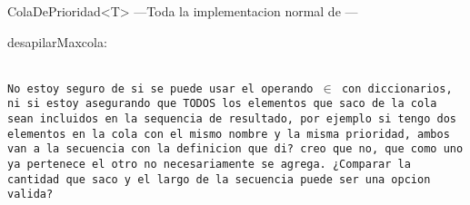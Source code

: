 \documentclass[10pt,a4paper]{article}
\begin{document}
\begin{tad}{ColaDePrioridad\textless T\textgreater}
    ---Toda la implementacion normal de \nt ---
    \begin{proc}{desapilarMax}{\Inout cola:\nt}{}
        {\color{red}}
    \end{proc}
\end{tad}
\\\texttt{\color{red}No estoy seguro de si se puede usar el operando $\in$ con diccionarios, ni si estoy asegurando que TODOS los 
elementos que saco de la cola sean incluidos en la sequencia de resultado, por ejemplo si tengo dos elementos en la cola con el 
mismo nombre y la misma prioridad, ambos van a la secuencia con la definicion que di? creo que no, que como uno ya pertenece el otro 
no necesariamente se agrega. ¿Comparar la cantidad que saco y el largo de la secuencia puede ser una opcion valida?}
\end{document}
